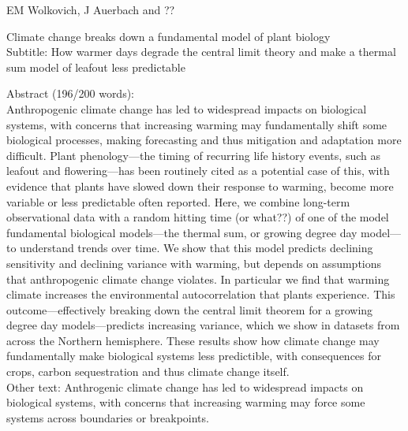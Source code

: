 \documentclass[11pt]{article}
\begin{document}
\renewcommand{\refname}{\CHead{}}

EM Wolkovich, J Auerbach and ??

Climate change breaks down a fundamental model of plant biology\\
Subtitle: How warmer days degrade the central limit theory and make a thermal sum model of leafout less predictable

Abstract (196/200 words): \\
Anthropogenic climate change has led to widespread impacts on biological systems, with concerns that increasing warming may fundamentally shift some biological processes, making forecasting and thus mitigation and adaptation more difficult. Plant phenology---the timing of recurring life history events, such as leafout and flowering---has been routinely cited as a potential case of this, with evidence that plants have slowed down their response to warming, become more variable or less predictable often reported. Here, we combine long-term observational data with a random hitting time (or what??) of one of the model fundamental biological models---the thermal sum, or growing degree day model---to understand trends over time. We show that this model predicts declining sensitivity and declining variance with warming, but depends on assumptions that anthropogenic climate change violates. In particular we find that warming climate increases the environmental autocorrelation that plants experience. This outcome---effectively breaking down the central limit theorem for a growing degree day models---predicts increasing variance, which we show in datasets from across the Northern hemisphere. These results show how climate change may fundamentally make biological systems less predictible, with consequences for crops, carbon sequestration and thus climate change itself. \\



Other text: 
Anthrogenic climate change has led to widespread impacts on biological systems, with concerns that increasing warming may force some systems across boundaries or breakpoints. 
\end{document}
